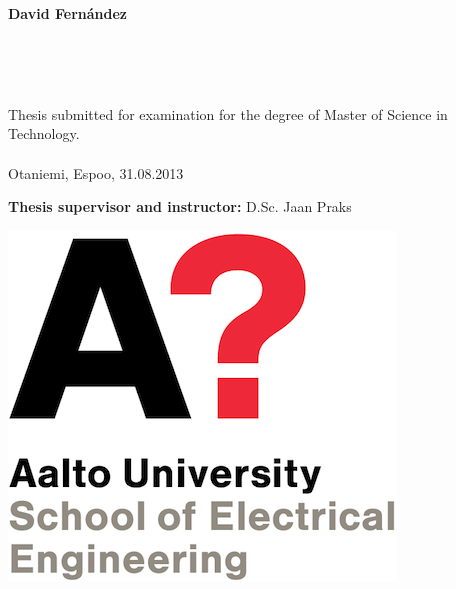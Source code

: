 \thispagestyle{empty}
\noindent
\hspace*{10mm}%
\parbox{0.75\textwidth-10mm}{\textbf{David Fernández}}\par%
\vspace{6mm}%
\noindent

\hspace*{10mm}%
\parbox[t][120pt]{\textwidth-10mm}{\raggedright%
\fontsize{15}{15}}\par%
\vspace{20mm}
 
 
\noindent%
\hspace*{10mm}%
\parbox{1\textwidth-10mm}{\raggedright\small%
{\fontsize{12}{11.1}%
}\\[1em]
}\par%
 
\noindent%
\hspace*{10mm}%
\parbox{1\textwidth-10mm}{\raggedright\small%
{\fontsize{10}{11.1}%
}\\[1em]
}\par%

\vspace{1ex}%
\noindent%
\hspace*{10mm}%
\parbox{1\textwidth}{ \small 
Thesis submitted for examination for the degree of Master of Science in Technology.\\
\\
Otaniemi, Espoo, 31.08.2013
}\par

\vspace{23mm}%
\noindent%
\hspace*{10mm}
\parbox{1\textwidth}{ \small 
\small \textbf{Thesis supervisor and instructor:} D.Sc. Jaan Praks
}\par
\noindent%

\vspace{5cm}%

\parbox [h]{0.75\textwidth-10mm}{
\hspace{10mm}
\includegraphics{images/aaltologothesis.png}
}\par

\pagebreak
